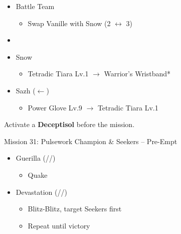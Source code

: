 \begin{menu}
	\begin{itemize}
	\paradigm
		\begin{itemize}
			\item Battle Team
				\begin{itemize}
					\item Swap Vanille with Snow (2 $\leftrightarrow$ 3)
				\end{itemize}
			\item {}%
				{\paradigmline[4]{(\syn)}{(\rav)}{(\sab)}}%
				{\paradigmline{\com}{\sen}{\sab}}%
				{\paradigmline{\syn}{\sen}{\med}}%
				{\paradigmline{\com}{\com}{\sab}}%
				{\paradigmline{\rav}{\rav}{\sab}}%
				{\paradigmline{\com}{\com}{\med}}%
		\end{itemize}
	\equip
		\begin{itemize}
			\item Snow
				\begin{itemize}
					\item Tetradic Tiara Lv.1 $\rightarrow$ Warrior's Wristband*
				\end{itemize}			
			\item Sazh ($\leftarrow$)
				\begin{itemize}
					\item Power Glove Lv.9 $\rightarrow$ Tetradic Tiara Lv.1
				\end{itemize}			
		\end{itemize}
	\end{itemize}
\end{menu}


\renewcommand{\first}{[1] Guerilla (\syn/\rav/\sab)}
\renewcommand{\second}{[2] Dirty Fighting (\com/\sen/\sab)}
\renewcommand{\third}{[3] Protection (\syn/\sen/\med)}
\renewcommand{\fourth}{[4] Devastation (\com/\com/\sab)}
\renewcommand{\fifth}{[5] Smart Bomb (\rav/\rav/\sab)}
\renewcommand{\sixth}{[6] Tireless Charge (\com/\com/\med)}

Activate a \textbf{Deceptisol} before the mission.

\begin{battle}{Mission 31: Pulsework Champion \& Seekers -- Pre-Empt}
	\begin{itemize}
		\item \first
			\begin{itemize}
				\item Quake
			\end{itemize}
		\item \fourth
			\begin{itemize}
				\item Blitz-Blitz, target Seekers first
				\item Repeat until victory
			\end{itemize}
	\end{itemize}
\end{battle}

